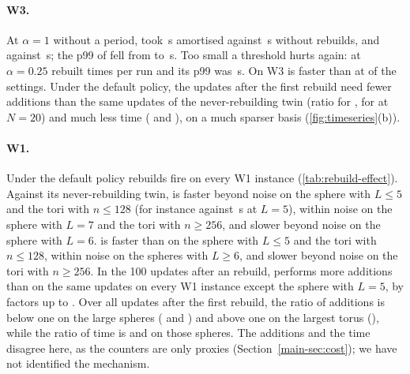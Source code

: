 \paragraph{W3.} At $\alpha=1$ without a period,  took
\NumESevenWThreeNTwentyMmhmAOnePOffAmort\,\textmu s amortised against
\NumESevenWThreeNTwentyMmhmAOffPOffAmort\,\textmu s without rebuilds, and
 \NumESevenWThreeNTwentyDrbIdRbAOnePOffAmort{} against
\NumESevenWThreeNTwentyDrbIdRbAOffPOffAmort\,\textmu s; the p99 of
 fell from \NumESevenWThreeNTwentyMmhmAOffPOffPNinetyNine{} to
\NumESevenWThreeNTwentyMmhmAOnePOffPNinetyNine\,\textmu s. Too small a threshold
hurts again: at $\alpha=0.25$  rebuilt
\NumESevenWThreeNTwentyMmhmAQuarterPOffRebuilds{} times per run and its p99 was
\NumESevenWThreeNTwentyMmhmAQuarterPOffPNinetyNine\,\textmu s. On W3
 is faster than  at
\NumESevenWThreeNTwentyMmhmBelowDrbIdRb{} of the
\NumESevenWThreeNTwentySettings{} settings. Under the default policy, the updates
after the first rebuild need fewer additions than the same updates of the
never-rebuilding twin (ratio \NumRebuildEffectWThreeNTwentyMmhmAfterFirst{} for
, \NumRebuildEffectWThreeNTwentyDrbIdRbAfterFirst{} for
 at $N=20$) and much less time
(\NumRebuildEffectWThreeNTwentyMmhmAfterFirstTime{} and
\NumRebuildEffectWThreeNTwentyDrbIdRbAfterFirstTime), on a much sparser basis
(\cref{fig:timeseries}(b)).

\paragraph{W1.} Under the default policy rebuilds fire on every W1 instance
(\cref{tab:rebuild-effect}). Against its never-rebuilding twin,  is
faster beyond noise on the sphere with $L\le5$ and the tori with $n\le128$
(for instance \NumWOneSphereLFiveMmhmAmort{} against
\NumWOneSphereLFiveMmhmNorbAmort\,\textmu s at $L=5$), within noise on the
sphere with $L=7$ and the tori with $n\ge256$, and slower beyond noise on the
sphere with $L=6$.  is faster than  on the
sphere with $L\le5$ and the tori with $n\le128$, within noise on the spheres
with $L\ge6$, and slower beyond noise on the tori with $n\ge256$. In the 100
updates after an  rebuild,  performs more additions
than  on the same updates on every W1 instance except the
sphere with $L=5$, by factors up to \NumRebuildEffectWOneTorusFiveHundredMmhmWindow.
Over all updates after the first rebuild, the ratio of additions is below one on
the large spheres (\NumRebuildEffectWOneSphereLSixMmhmAfterFirst{} and
\NumRebuildEffectWOneSphereLSevenMmhmAfterFirst) and above one on the largest
torus (\NumRebuildEffectWOneTorusFiveHundredMmhmAfterFirst), while the ratio of
time is \NumRebuildEffectWOneSphereLSixMmhmAfterFirstTime{} and
\NumRebuildEffectWOneSphereLSevenMmhmAfterFirstTime{} on those spheres. The
additions and the time disagree here, as the counters are only proxies
(Section~\ref{main-sec:cost}); we have not identified the mechanism.

